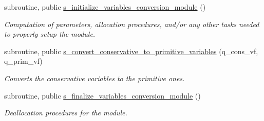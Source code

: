 \begin{DoxyCompactItemize}
subroutine, public \hyperlink{namespacem__variables__conversion_ac006af9a5403b2fdad7f81ce0a67ecec}{s\+\_\+initialize\+\_\+variables\+\_\+conversion\+\_\+module} ()
\begin{DoxyCompactList}\small\item\em Computation of parameters, allocation procedures, and/or any other tasks needed to properly setup the module. \end{DoxyCompactList}\item 
subroutine, public \hyperlink{namespacem__variables__conversion_abecd489e8c769f12646d2647fab7dd53}{s\+\_\+convert\+\_\+conservative\+\_\+to\+\_\+primitive\+\_\+variables} (q\+\_\+cons\+\_\+vf, q\+\_\+prim\+\_\+vf)
\begin{DoxyCompactList}\small\item\em Converts the conservative variables to the primitive ones. \end{DoxyCompactList}\item 
subroutine, public \hyperlink{namespacem__variables__conversion_a6a3f90e69ef4dea304495d0f7c068de2}{s\+\_\+finalize\+\_\+variables\+\_\+conversion\+\_\+module} ()
\begin{DoxyCompactList}\small\item\em Deallocation procedures for the module. \end{DoxyCompactList}\end{DoxyCompactItemize}
